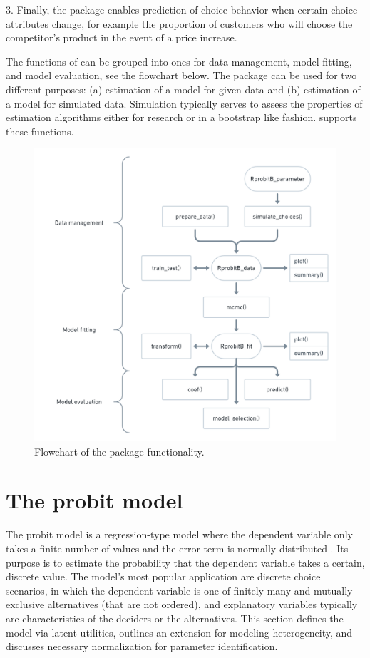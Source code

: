 \documentclass[article]{jss}
\begin{document}
3. Finally, the package enables prediction of choice behavior when certain choice attributes change, for example the proportion of customers who will choose the competitor's product in the event of a price increase.

The functions of  can be grouped into ones for data management, model fitting, and model evaluation, see the flowchart below. The package can be used for two different purposes: (a) estimation of a model for given data and (b) estimation of a model for simulated data. Simulation typically serves to assess the properties of estimation algorithms either for research or in a bootstrap like fashion.  supports these functions.

\begin{figure}[t!]
  \includegraphics[scale = 0.4]{flowchart.png}
  \caption{Flowchart of the package functionality.}
  \label{fig:flowchart}
\end{figure}


\section{The probit model} \label{sec:probit_model}

The probit model is a regression-type model where the dependent variable only takes a finite number of values and the error term is normally distributed \citep{Agresti:2015}. Its purpose is to estimate the probability that the dependent variable takes a certain, discrete value. The model's most popular application are discrete choice scenarios, in which the dependent variable is one of finitely many and mutually exclusive alternatives (that are not ordered), and explanatory variables typically are characteristics of the deciders or the alternatives. This section defines the model via latent utilities, outlines an extension for modeling heterogeneity, and discusses necessary normalization for parameter identification.
\end{document}
